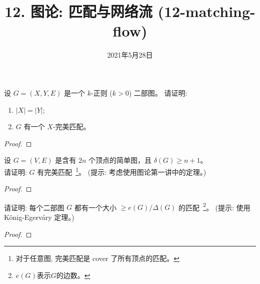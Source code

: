 \documentclass[a4paper, justified]{tufte-handout}
\title{12. 图论: 匹配与网络流 (12-matching-flow)}
\date{2021年5月28日}
\begin{document}
\maketitle
\noplagiarism %
\begin{abstract}
\end{abstract}
\beginrequired

\begin{problem}[\score{5 = 2 + 3} $\star\star$]
  设 $G = (X, Y, E)$ 是一个 $k$-正则 ($k > 0$) 二部图。
  请证明:
  \begin{enumerate}[(1)]
    \item $|X| = |Y|$;
    \item $G$ 有一个 $X$-完美匹配。
  \end{enumerate}
\end{problem}

\begin{proof}
\end{proof}

\begin{problem}
  设 $G = (V, E)$ 是含有 $2n$ 个顶点的简单图，且 $\delta(G) \ge n + 1$。\\
  请证明: $G$ 有完美匹配~\footnote{对于任意图, 完美匹配是 cover 了所有顶点的匹配。}。
  (提示: 考虑使用图论第一讲中的定理。)
\end{problem}

\begin{proof}
\end{proof}

\begin{problem}
  请证明: 每个二部图 $G$ 都有一个大小 $\ge e(G)/\Delta(G)$ 的匹配~\footnote{$e(G)$表示$G$的边数。}。
  (提示: 使用 K\"{o}nig-Egerv\'{a}ry 定理。)
\end{problem}

\begin{proof}
\end{proof}
\end{document}

